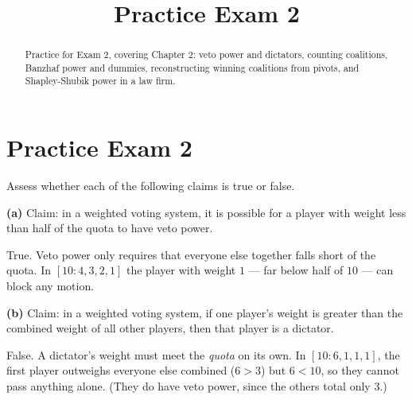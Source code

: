 \documentclass[12pt]{ximera}
\title{Practice Exam 2}
\begin{document}
\begin{abstract}
Practice for Exam 2, covering Chapter 2: veto power and dictators, counting coalitions,
Banzhaf power and dummies, reconstructing winning coalitions from pivots, and
Shapley-Shubik power in a law firm.
\end{abstract}
\maketitle

\section*{Practice Exam 2}

\begin{problem}
Assess whether each of the following claims is true or false.

\begin{prompt}
\textbf{(a)} Claim: in a weighted voting system, it is possible for a player with weight
less than half of the quota to have veto power.

\begin{multipleChoice}
\end{multipleChoice}

\begin{feedback}
True. Veto power only requires that everyone else together falls short of the quota. In
$[10:4,3,2,1]$ the player with weight $1$ --- far below half of $10$ --- can block any
motion.
\end{feedback}
\end{prompt}

\begin{prompt}
\textbf{(b)} Claim: in a weighted voting system, if one player's weight is greater than
the combined weight of all other players, then that player is a dictator.

\begin{multipleChoice}
\end{multipleChoice}

\begin{feedback}
False. A dictator's weight must meet the \emph{quota} on its own. In $[10:6,1,1,1]$, the
first player outweighs everyone else combined ($6>3$) but $6<10$, so they cannot pass
anything alone. (They do have veto power, since the others total only $3$.)
\end{feedback}
\end{prompt}


\end{problem}
\end{document}
